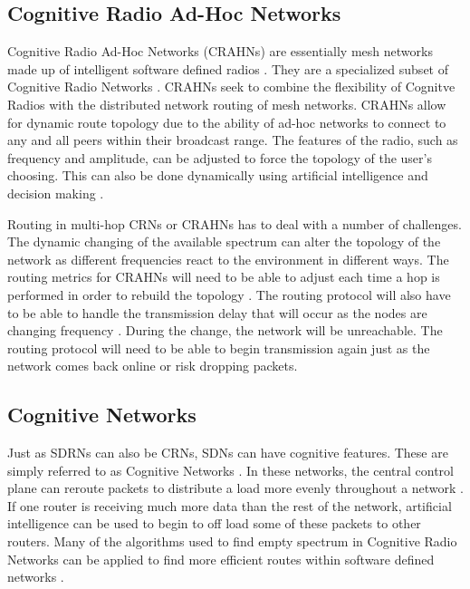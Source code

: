 \subsection{Cognitive Radio Ad-Hoc Networks}

Cognitive Radio Ad-Hoc Networks (CRAHNs) are essentially mesh networks made up of intelligent software defined radios \cite{Akyildiz2009810}. They are a specialized subset of Cognitive Radio Networks \cite{5639025}. CRAHNs seek to combine the flexibility of Cognitve Radios with the distributed network routing of mesh networks. CRAHNs allow for dynamic route topology due to the ability of ad-hoc networks to connect to any and all peers within their broadcast range. The features of the radio, such as frequency and amplitude, can be adjusted to force the topology of the user's choosing. This can also be done dynamically using artificial intelligence and decision making \cite{Akyildiz2009810}. 

Routing in multi-hop CRNs or CRAHNs has to deal with a number of challenges. The dynamic changing of the available spectrum can alter the topology of the network as different frequencies react to the environment in different ways. The routing metrics for CRAHNs will need to be able to adjust each time a hop is performed in order to rebuild the topology \cite{6599059}. The routing protocol will also have to be able to handle the transmission delay that will occur as the nodes are changing frequency \cite{6599059}. During the change, the network will be unreachable. The routing protocol will need to be able to begin transmission again just as the network comes back online or risk dropping packets. 

\subsection{Cognitive Networks}

Just as SDRNs can also be CRNs, SDNs can have cognitive features. These are simply referred to as Cognitive Networks \cite{7207253}. In these networks, the central control plane can reroute packets to distribute a load more evenly throughout a network \cite{6982928}. If one router is receiving much more data than the rest of the network, artificial intelligence can be used to begin to off load some of these packets to other routers. Many of the algorithms used to find empty spectrum in Cognitive Radio Networks can be applied to find more efficient routes within software defined networks \cite{7207253} \cite{6982928}. 



